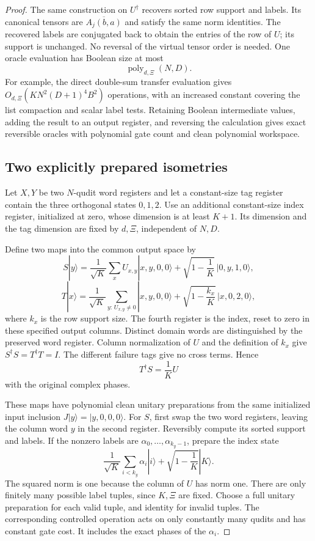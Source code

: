 \documentclass[11pt]{article}
\begin{document}
\begin{proof}
The same construction on $U^\dagger$ recovers sorted row
support and labels. Its canonical tensors are
$\overline{A_j(b,a)}$ and satisfy the same norm identities.
The recovered labels are conjugated back to obtain the
entries of the row of $U$; its support is unchanged.
No reversal of the virtual tensor order is needed.
One oracle evaluation has Boolean size at most
\[
 \operatorname{poly}_{d,\Xi}(N,D).
\]
For example, the direct double-sum transfer evaluation gives
$O_{d,\Xi}(KN^2(D+1)^4B^2)$ operations, with an increased
constant covering the list compaction and scalar label tests.
Retaining Boolean intermediate values, adding the result
to an output register, and reversing the calculation gives
exact reversible oracles with polynomial gate count and
clean polynomial workspace.

\subsection*{Two explicitly prepared isometries}

Let $X,Y$ be two $N$-qudit word registers and let a constant-size
tag register contain the three orthogonal states $0,1,2$.
Use an additional constant-size index register, initialized
at zero, whose dimension is at least $K+1$.
Its dimension and the tag dimension are fixed by $d,\Xi$,
independent of $N,D$.

Define two maps into the common output space by
\[
 S|y\rangle=
 \frac1{\sqrt K}\sum_x U_{x,y}|x,y,0,0\rangle
       +\sqrt{1-\frac1K}\,|0,y,1,0\rangle,
\]
\[
 T|x\rangle=
 \frac1{\sqrt K}\sum_{y:\,U_{x,y}\ne0}|x,y,0,0\rangle
       +\sqrt{1-\frac{k_x}{K}}\,|x,0,2,0\rangle,
\]
where $k_x$ is the row support size.
The fourth register is the index, reset to zero in these
specified output columns. Distinct domain words are
distinguished by the preserved word register. Column
normalization of $U$ and the definition of $k_x$ give
$S^\dagger S=T^\dagger T=I$. The different failure tags
give no cross terms. Hence
\[
 T^\dagger S=\frac1K U
\]
with the original complex phases.

These maps have polynomial clean unitary preparations from
the same initialized input inclusion
$J|y\rangle=|y,0,0,0\rangle$.
For $S$, first swap the two word registers, leaving the
column word $y$ in the second register. Reversibly compute
its sorted support and labels. If the nonzero labels are
$\alpha_0,\ldots,\alpha_{k_y-1}$, prepare the index state
\[
 \frac1{\sqrt K}\sum_{i<k_y}\alpha_i|i\rangle
       +\sqrt{1-\frac1K}|K\rangle.
\]
The squared norm is one because the column of $U$ has
norm one. There are only finitely many possible label
tuples, since $K,\Xi$ are fixed. Choose a full unitary
preparation for each valid tuple, and identity for invalid
tuples. The corresponding controlled operation acts on
only constantly many qudits and has constant gate cost.
It includes the exact phases of the $\alpha_i$.


\end{proof}
\end{document}
